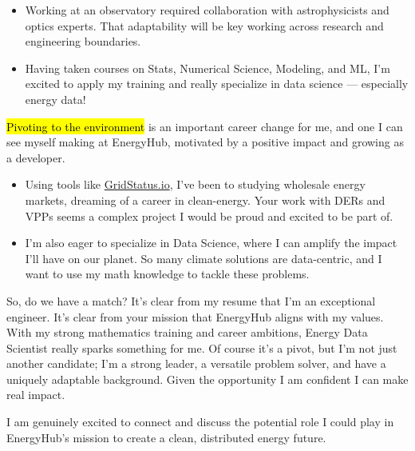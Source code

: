 \documentclass{tc_cv}
\begin{document}
\begin{adjustwidth}{38pt}{38pt}
\begin{itemize}
    \item Working at an observatory required collaboration with astrophysicists
      and optics experts. That adaptability will be key working across
      research and engineering boundaries.

    \item Having taken courses on Stats, Numerical Science, Modeling, and ML,
      I'm excited to apply my training and really specialize in data science
      --- especially energy data!

  \end{itemize} \medbreak

  \hl{Pivoting to the environment} is an important career change for me, and
  one I can see myself making at EnergyHub, motivated by a positive impact
  and growing as a developer.
  \begin{itemize}

    \item Using tools like \href{http://gridstatus.io}{GridStatus.io}, I've
      been to studying wholesale energy markets, dreaming of a career in
      clean-energy. Your work with DERs and VPPs seems a complex project I
      would be proud and excited to be part of.

    \item I'm also eager to specialize in Data Science, where I can amplify the
      impact I'll have on our planet. So many climate solutions are
      data-centric, and I want to use my math knowledge to tackle these
      problems.

  \end{itemize} \medbreak

  So, do we have a match? It's clear from my resume that I'm an exceptional
  engineer. It's clear from your mission that EnergyHub aligns with my values.
  With my strong mathematics training and career ambitions, Energy Data
  Scientist really sparks something for me. Of course it's a pivot, but I'm not
  just another candidate; I'm a strong leader, a versatile problem solver, and
  have a uniquely adaptable background. Given the opportunity I am confident I
  can make real impact. \medbreak

  I am genuinely excited to connect and discuss the potential role I could play
  in EnergyHub's mission to create a clean, distributed energy future.


\end{adjustwidth}
\end{document}
